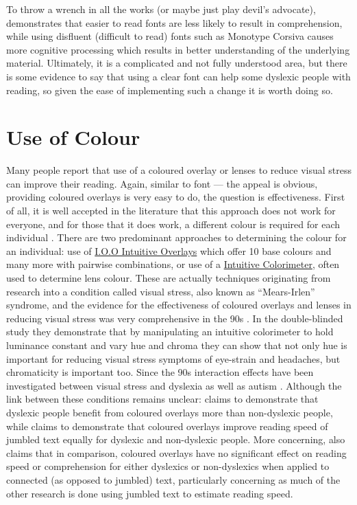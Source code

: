 \documentclass[17pt]{memoir}
\begin{document}
To throw a wrench in all the works (or maybe just play devil's advocate), \cite{French2013} demonstrates that easier to read fonts are less likely to result in comprehension, while using disfluent (difficult to read) fonts such as Monotype Corsiva causes more cognitive processing which results in better understanding of the underlying material. Ultimately, it is a complicated and not fully understood area, but there is some evidence to say that using a clear font can help some dyslexic people with reading, so given the ease of implementing such a change it is worth doing so.



\section*{Use of Colour}

Many people report that use of a coloured overlay or lenses to reduce visual stress can improve their reading. Again, similar to font --- the appeal is obvious, providing coloured overlays is very easy to do, the question is effectiveness. First of all, it is well accepted in the literature that this approach does not work for everyone, and for those that it does work, a different colour is required for each individual \cite{Lightstone1999}. There are two predominant approaches to determining the colour for an individual: use of \href{https://www.thedyslexiashop.co.uk/i-o-o-intuitive-coloured-a4-overlays.html}{I.O.O Intuitive Overlays} which offer 10 base colours and many more with pairwise combinations, or use of a \href{https://www.cerium.com.au/cerium-optical-technologies/intuitive-colorimeter}{Intuitive Colorimeter}, often used to determine lens colour. These are actually techniques originating from research into a condition called visual stress, also known as “Mears-Irlen” syndrome, and the evidence for the effectiveness of coloured overlays and lenses in reducing visual stress was very comprehensive in the 90s \cite{Jeanes1997}. In the double-blinded study \cite{Wilkins1994} they demonstrate that by manipulating an intuitive colorimeter to hold luminance constant and vary hue and chroma they can show that not only hue is important for reducing visual stress symptoms of eye-strain and headaches, but chromaticity is important too. Since the 90s interaction effects have been investigated between visual stress and dyslexia \cite{Singleton2005} as well as autism \cite{Ludlow2006}. Although the link between these conditions remains unclear: \cite{Singleton2005} claims to demonstrate that dyslexic people benefit from coloured overlays more than non-dyslexic people, while \cite{Henderson2013} claims to demonstrate that coloured overlays improve reading speed of jumbled text equally for dyslexic and non-dyslexic people. More concerning, \cite{Henderson2013}
also claims that in comparison, coloured overlays have no significant effect on reading speed or comprehension for either dyslexics or non-dyslexics when applied to connected (as opposed to jumbled) text, particularly concerning as much of the other research is done using jumbled text to estimate reading speed.
\end{document}
